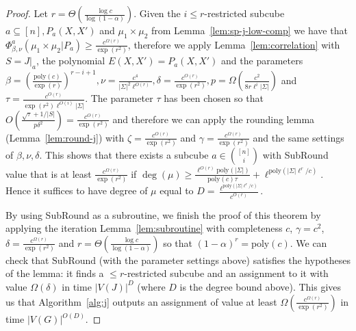 \documentclass[11pt]{article}
\def \poly {\mathrm{poly}}
\theoremstyle{definition}
\begin{document}
\begin{proof}
Let $r = \Theta(\frac{\log c}{\log(1-\alpha)})$. Given the $i \leq r$-restricted subcube $a \subseteq [n], P_a(X,X')$ and $\mu_1 \times \mu_2$ from Lemma~\ref{lem:sp-j-low-comp} we have that $\Phi_{\beta,\nu}^a(\mu_1 \times \mu_2| P_a) \geq \frac{c^{\Omega(r)}}{\exp(r^2)}$, therefore we apply Lemma~\ref{lem:correlation} with $S = J|_a$, the polynomial  $E(X,X') = P_a(X,X')$ and the parameters $\beta = \left(\frac{\poly(c)}{\exp(r)}\right)^{r-i+1}, \nu = \frac{c^4}{|\Sigma|^2\ell^{O(r)}}, \delta = \frac{c^{O(r)}}{\exp(r^2)}, p = \Omega\left(\frac{c^2}{8r\ell^i|\Sigma|}\right)$ and $\tau = \frac{c^{O(r)}}{\exp(r^2)\ell^{O(i)}|\Sigma|}$. The parameter $\tau$ has been chosen so that $O(\frac{\sqrt{\tau}+1/|S|}{p\delta^2}) = \frac{c^{O(r)}}{\exp(r^2)}$ and therefore we can apply the rounding lemma (Lemma~\ref{lem:round-j}) with $\zeta = \frac{c^{O(r)}}{\exp(r^2)}$ and $\gamma = \frac{c^{\Omega(r)}}{\exp(r^2)}$ and the same settings of $\beta, \nu, \delta$. This shows that there exists a subcube $a \in {[n] \choose i}$ with SubRound value that is at least $\frac{c^{\Omega(r)}}{\exp(r^2)}$ if $\deg(\mu) \geq  \frac{\ell^{O(r)}\poly(|\Sigma|)}{\poly(c)\tau}+ \ell^{\poly(|\Sigma|\ell^r/c)}$. Hence it suffices to have degree of $\mu$ equal to $D = \frac{\ell^{\poly(|\Sigma|\ell^r/c)}}{c^{O(r)}}$.

By using SubRound as a subroutine, we finish the proof of this theorem by applying the iteration Lemma~\ref{lem:subroutine} with completeness $c$, $\gamma = c^2$, $\delta = \frac{c^{\Omega(r)}}{\exp(r^2)}$ and $r = \Theta(\frac{\log c}{\log(1-\alpha)})$ so that $(1-\alpha)^r = \poly(c)$. We can check that SubRound (with the parameter settings above) satisfies the hypotheses of the lemma: it finds a $\le r$-restricted subcube and an assignment to it with value $\Omega(\delta)$ in time $|V(J)|^{D}$ (where $D$ is the degree bound above). This gives us that Algorithm~\ref{alg:j} outputs an assignment of value at least $\Omega\left(\frac{c^{\Omega(r)}}{\exp(r^2)}\right)$ in time $|V(G)|^{O(D)}$.
\end{proof}
\end{document}
